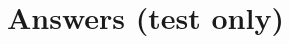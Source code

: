 \documentclass[12pt,a4paper]{article}
\begin{document}

\clearpage
\section*{Answers (test only)}

\end{document}
